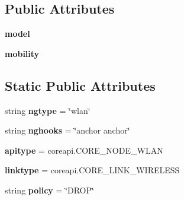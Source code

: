 \subsection*{Public Attributes}
\begin{DoxyCompactItemize}
\item 
\hypertarget{classcore_1_1bsd_1_1nodes_1_1_wlan_node_a0ad2b31659f8f7d5442d20176b817be8}{{\bfseries model}}\label{classcore_1_1bsd_1_1nodes_1_1_wlan_node_a0ad2b31659f8f7d5442d20176b817be8}

\item 
\hypertarget{classcore_1_1bsd_1_1nodes_1_1_wlan_node_a4e5bbadc46ca8f3d71f732b73e3d4419}{{\bfseries mobility}}\label{classcore_1_1bsd_1_1nodes_1_1_wlan_node_a4e5bbadc46ca8f3d71f732b73e3d4419}

\end{DoxyCompactItemize}
\subsection*{Static Public Attributes}
\begin{DoxyCompactItemize}
\item 
\hypertarget{classcore_1_1bsd_1_1nodes_1_1_wlan_node_a718dd30a85261d492a6b8868b32a6e23}{string {\bfseries ngtype} = \char`\"{}wlan\char`\"{}}\label{classcore_1_1bsd_1_1nodes_1_1_wlan_node_a718dd30a85261d492a6b8868b32a6e23}

\item 
\hypertarget{classcore_1_1bsd_1_1nodes_1_1_wlan_node_a4fad1ff402558838f158948769c8910d}{string {\bfseries nghooks} = \char`\"{}anchor anchor\char`\"{}}\label{classcore_1_1bsd_1_1nodes_1_1_wlan_node_a4fad1ff402558838f158948769c8910d}

\item 
\hypertarget{classcore_1_1bsd_1_1nodes_1_1_wlan_node_ab296f6b346087d6b4e16ed3e9ccaebcc}{{\bfseries apitype} = coreapi.\+C\+O\+R\+E\+\_\+\+N\+O\+D\+E\+\_\+\+W\+L\+A\+N}\label{classcore_1_1bsd_1_1nodes_1_1_wlan_node_ab296f6b346087d6b4e16ed3e9ccaebcc}

\item 
\hypertarget{classcore_1_1bsd_1_1nodes_1_1_wlan_node_a1813b4c3e7843317ee87472d9fecac0f}{{\bfseries linktype} = coreapi.\+C\+O\+R\+E\+\_\+\+L\+I\+N\+K\+\_\+\+W\+I\+R\+E\+L\+E\+S\+S}\label{classcore_1_1bsd_1_1nodes_1_1_wlan_node_a1813b4c3e7843317ee87472d9fecac0f}

\item 
\hypertarget{classcore_1_1bsd_1_1nodes_1_1_wlan_node_ab898b13fc2d23db5cea972231bbc7f25}{string {\bfseries policy} = \char`\"{}D\+R\+O\+P\char`\"{}}\label{classcore_1_1bsd_1_1nodes_1_1_wlan_node_ab898b13fc2d23db5cea972231bbc7f25}

\end{DoxyCompactItemize}


